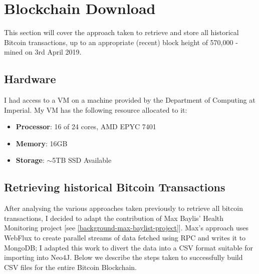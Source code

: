 \chapter{Blockchain Download}\label{section-blockchain-download}
This section will cover the approach taken to retrieve and store all historical Bitcoin transactions, up to an appropriate (recent) block height of 570,000 - mined on 3rd April 2019. 

\section{Hardware}\label{satoshi-specs}
I had access to a VM on a machine provided by the Department of Computing at Imperial.  My VM has the following resource allocated to it:
\begin{itemize}
    \item \textbf{Processor}: 16 of 24 cores, AMD EPYC 7401
    \item \textbf{Memory}: 16GB
    \item \textbf{Storage}: $\sim$5TB SSD Available
\end{itemize}

\section{Retrieving historical Bitcoin Transactions}
After analysing the various approaches taken previously to retrieve all bitcoin transactions, I decided to adapt the contribution of Max Baylis' Health Monitoring project [see \ref{background-max-baylist-project}]. Max's approach uses WebFlux to create parallel streams of data fetched using RPC and writes it to MongoDB; I adapted this work to divert the data into a CSV format suitable for importing into Neo4J. Below we describe the steps taken to successfully build CSV files for the entire Bitcoin Blockchain. 

